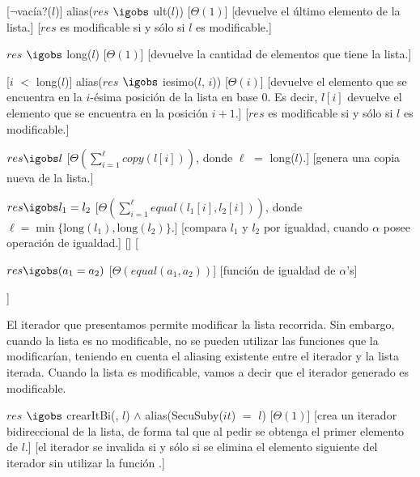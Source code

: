 \begin{Interfaz}
  [$\lnot$vacía?($l$)]
  {alias($res$ $\igobs$ ult($l$))}
  [$\Theta(1)$]
  [devuelve el último elemento de la lista.]
  [$res$ es modificable si y sólo si $l$ es modificable.]

  {$res$ $\igobs$ long($l$)}
  [$\Theta(1)$]
  [devuelve la cantidad de elementos que tiene la lista.]

  [$i$ $<$ long($l$)]
  {alias($res$ $\igobs$ iesimo($l$, $i$))}
  [$\Theta(i)$]
  [devuelve el elemento que se encuentra en la $i$-ésima posición de la lista en base $0$.  Es decir, {$l[i]$} devuelve el elemento que se encuentra en la posición $i+1$.]  
  [$res$ es modificable si y sólo si $l$ es modificable.]

  {$res \igobs l$}
  [{$\displaystyle\Theta\left(\sum_{i=1}^{\ell}copy({l[i]})\right)$, donde $\ell$ $=$ long($l$).}]
  [genera una copia nueva de la lista.]

  {$res \igobs l_1 = l_2$}
  [{$\displaystyle\Theta\left(\sum_{i=1}^{\ell}{equal(l_1[i],l_2[i])}\right)$, donde $\ell = \min\{\text{long}(l_1),\text{long}(l_2)\}$}.]
  [compara $l_1$ y $l_2$ por igualdad, cuando $\alpha$ posee operación de igualdad.]
  []%
  [{\parbox[t]{\textwidth-3cm}{%
    {$res \igobs (a_1 = a_2)$}
    [$\Theta(equal(a_1, a_2))$]
    [función de igualdad de $\alpha$'s]
  }}]


  El iterador que presentamos permite modificar la lista recorrida.  Sin embargo, cuando la lista es no modificable, no se pueden utilizar las funciones que la modificarían, teniendo en cuenta el aliasing existente entre el iterador y la lista iterada.  Cuando la lista es modificable, vamos a decir que el iterador generado es modificable.

  {$res$ $\igobs$ crearItBi(\secuencia{}, $l$) $\land$ alias(SecuSuby($it$) $=$ $l$)}
  [$\Theta(1)$]
  [crea un iterador bidireccional de la lista, de forma tal que al pedir  se obtenga el primer elemento de $l$.]
  [el iterador se invalida si y sólo si se elimina el elemento siguiente del iterador sin utilizar la función .]


\end{Interfaz}
